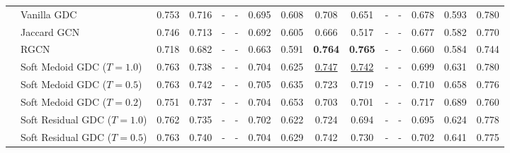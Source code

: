 \documentclass{article} %
\begin{document}
\begin{table}
{\begin{tabular}{llccccccccccccc}
                           & Vanilla GDC &              0.753 &              0.716 &                  - &                  - &              0.695 &              0.608 &              0.708 &              0.651 &                  - &                  - &              0.678 &              0.593 &              0.780 \\
                           & Jaccard GCN &              0.746 &              0.713 &                  - &                  - &              0.692 &              0.605 &              0.666 &              0.517 &                  - &                  - &              0.677 &              0.582 &              0.770 \\
                           & RGCN &              0.718 &              0.682 &                  - &                  - &              0.663 &              0.591 &     \textbf{0.764} &     \textbf{0.765} &                  - &                  - &              0.660 &              0.584 &              0.744 \\
                           & Soft Medoid GDC ($T=1.0$) &              0.763 &              0.738 &                  - &                  - &              0.704 &              0.625 &  \underline{0.747} &  \underline{0.742} &                  - &                  - &              0.699 &              0.631 &              0.780 \\
                           & Soft Medoid GDC ($T=0.5$) &              0.763 &              0.742 &                  - &                  - &              0.705 &              0.635 &              0.723 &              0.719 &                  - &                  - &              0.710 &              0.658 &              0.776 \\
                           & Soft Medoid GDC ($T=0.2$) &              0.751 &              0.737 &                  - &                  - &              0.704 &              0.653 &              0.703 &              0.701 &                  - &                  - &              0.717 &              0.689 &              0.760 \\
                           & Soft Residual GDC ($T=1.0$) &              0.762 &              0.735 &                  - &                  - &              0.702 &              0.622 &              0.724 &              0.694 &                  - &                  - &              0.695 &              0.624 &              0.778 \\
                           & Soft Residual GDC ($T=0.5$) &              0.763 &              0.740 &                  - &                  - &              0.704 &              0.629 &              0.742 &              0.730 &                  - &                  - &              0.702 &              0.641 &              0.775 \\

\end{tabular}}
\end{table}
\end{document}
